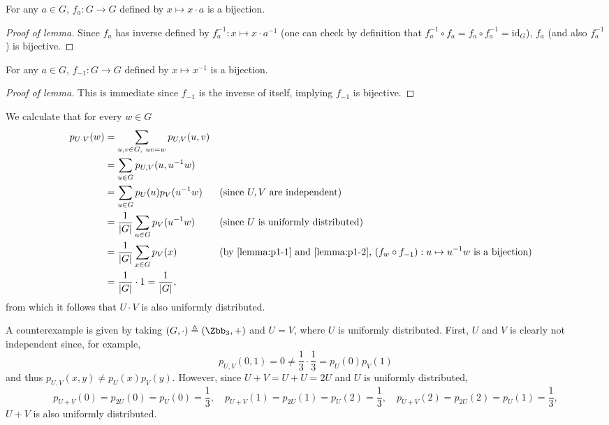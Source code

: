 \begin{answer}[ii]
    \leavevmode\par
    \begin{lemma}\label{lemma:p1-1}
        For any $a\in G$, $f_a: G\to G$ defined by $x\mapsto x\cdot a$ is a bijection.
    \end{lemma}
    \begin{proof}[Proof of lemma]
        Since  $f_a$ has inverse defined by $f_a^{-1}:x\mapsto x\cdot a^{-1}$ (one can check by definition that $f_a^{-1}\circ f_a = f_a\circ f_a^{-1}=\text{id}_G$), $f_a$ (and also $f_a^{-1}$) is bijective.
    \end{proof}

    \begin{lemma}\label{lemma:p1-2}
        For any $a\in G$, $f_{-1}: G\to G$ defined by $x\mapsto x^{-1}$ is a bijection.
    \end{lemma}
    \begin{proof}[Proof of lemma]
        This is immediate since $f_{-1}$ is the inverse of itself, implying $f_{-1}$ is bijective.
    \end{proof}

    We calculate that for every $w\in G$
    \begin{align*}
        p_{U\cdot V}(w) 
        &= \sum_{u,v\in G,\ uv=w} p_{U,V}(u,v) \\
        &= \sum_{u\in G} p_{U,V}(u,u^{-1}w) \\
        &= \sum_{u\in G} p_{U}(u) p_V(u^{-1}w) &&\textrm{(since $U,V$ are independent)}\\
        &= \frac{1}{|G|}\sum_{u\in G}   p_V(u^{-1}w) &&\textrm{(since $U$ is uniformly distributed)}\\
        &= \frac{1}{|G|}\sum_{x\in G}   p_V(x) &&\textrm{(by \autoref{lemma:p1-1} and \autoref{lemma:p1-2}, $(f_w\circ f_{-1}):u\mapsto u^{-1}w$ is a bijection)}\\
        &= \frac{1}{|G|}\cdot 1 = \frac{1}{|G|},
    \end{align*}
    from which it follows that $U\cdot V$ is also uniformly distributed.
\end{answer}


\begin{answer}[iii]
    A counterexample is given by taking $(G,\cdot)\triangleq (\Zbb_3, +)$ and $U=V$, where $U$ is uniformly distributed. First, $U$ and $V$ is clearly not independent since, for example,
    \[
        p_{U,V}(0,1)=0\neq \frac{1}{3}\cdot \frac{1}{3}=p_{U}(0)p_{V}(1)
    \]
    and thus $p_{U,V}(x,y)\neq p_{U}(x)p_{V}(y)$.
    However, since $U+ V=U+U=2U$ and $U$ is uniformly distributed,
    \[
        p_{U+V}(0)=p_{2U}(0)=p_{U}(0)=\frac{1}{3},\quad p_{U+V}(1)=p_{2U}(1)=p_{U}(2)=\frac{1}{3},\quad p_{U+V}(2)=p_{2U}(2)=p_{U}(1)=\frac{1}{3},
    \]
    $U+V$ is also uniformly distributed.
\end{answer}


